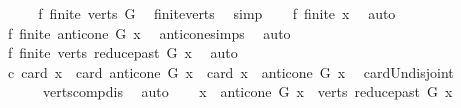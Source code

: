 \begin{isabellebody}
%
\isadelimproof
%
\endisadelimproof
%
\isatagproof
{}\isamarkupfalse%
\ {\isacharminus}{\kern0pt}\isanewline
\ \ \isamarkupfalse%
\ f{}{\isacharcolon}{\kern0pt}\ {\isachardoublequoteopen}finite\ {\isacharparenleft}{\kern0pt}verts\ G{\isacharparenright}{\kern0pt}{\isachardoublequoteclose}\ \isamarkupfalse%
\ finite{\isacharunderscore}{\kern0pt}verts\ \isamarkupfalse%
\ simp\isanewline
\ \ \isamarkupfalse%
\ f{}{\isacharcolon}{\kern0pt}\ {\isachardoublequoteopen}finite\ {\isacharbraceleft}{\kern0pt}x{\isacharbraceright}{\kern0pt}{\isachardoublequoteclose}\ \isamarkupfalse%
\ auto\isanewline
\ \ \isamarkupfalse%
\ f{}{\isacharcolon}{\kern0pt}\ {\isachardoublequoteopen}finite\ {\isacharparenleft}{\kern0pt}anticone\ G\ x{\isacharparenright}{\kern0pt}{\isachardoublequoteclose}\ \isamarkupfalse%
\ anticone{\isachardot}{\kern0pt}simps\ \isamarkupfalse%
\ auto\isanewline
\ \ \isamarkupfalse%
\ f{}{\isacharcolon}{\kern0pt}\ {\isachardoublequoteopen}finite\ {\isacharparenleft}{\kern0pt}verts\ {\isacharparenleft}{\kern0pt}reduce{\isacharunderscore}{\kern0pt}past\ G\ x{\isacharparenright}{\kern0pt}{\isacharparenright}{\kern0pt}{\isachardoublequoteclose}\ \isamarkupfalse%
\ auto\isanewline
\ \ \isamarkupfalse%
\ c{}{\isacharcolon}{\kern0pt}\ {\isachardoublequoteopen}card\ {\isacharbraceleft}{\kern0pt}x{\isacharbraceright}{\kern0pt}\ {\isacharplus}{\kern0pt}\ card\ {\isacharparenleft}{\kern0pt}anticone\ G\ x{\isacharparenright}{\kern0pt}\ {\isacharequal}{\kern0pt}\ card\ {\isacharparenleft}{\kern0pt}{\isacharbraceleft}{\kern0pt}x{\isacharbraceright}{\kern0pt}\ {\isasymunion}\ {\isacharparenleft}{\kern0pt}anticone\ G\ x{\isacharparenright}{\kern0pt}{\isacharparenright}{\kern0pt}{\isachardoublequoteclose}\ \isamarkupfalse%
\ card{\isacharunderscore}{\kern0pt}Un{\isacharunderscore}{\kern0pt}disjoint\isanewline
\ \ \ \ \ \ verts{\isacharunderscore}{\kern0pt}comp{\isacharunderscore}{\kern0pt}dis\ \isamarkupfalse%
\ auto\isanewline
\ \ \isamarkupfalse%
\ {\isachardoublequoteopen}{\isacharparenleft}{\kern0pt}{\isacharbraceleft}{\kern0pt}x{\isacharbraceright}{\kern0pt}\ {\isasymunion}\ {\isacharparenleft}{\kern0pt}anticone\ G\ x{\isacharparenright}{\kern0pt}{\isacharparenright}{\kern0pt}\ {\isasyminter}\ verts\ {\isacharparenleft}{\kern0pt}reduce{\isacharunderscore}{\kern0pt}past\ G\ x{\isacharparenright}{\kern0pt}\ {\isacharequal}{\kern0pt}\ {\isacharbraceleft}{\kern0pt}{\isacharbraceright}{\kern0pt}{\isachardoublequoteclose}\ \isamarkupfalse%

\end{isabellebody}
